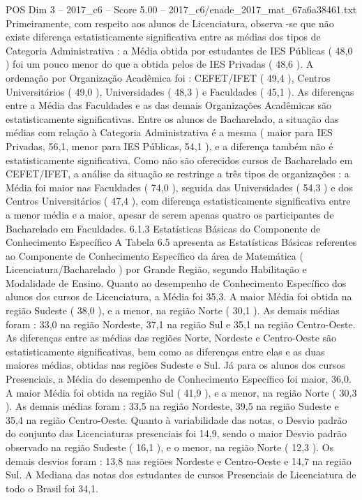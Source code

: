\begin{textsample}{POS Dim 3 – 2017\_c6 – Score 5.00 – 2017\_c6/enade\_2017\_mat\_67a6a38461.txt}
Primeiramente, com respeito aos alunos de Licenciatura, observa -se que não existe diferença estatisticamente significativa entre as médias dos tipos de Categoria Administrativa : a Média obtida por estudantes de IES Públicas ( 48,0 ) foi um pouco menor do que a obtida pelos de IES Privadas ( 48,6 ).
A ordenação por Organização Acadêmica foi : CEFET/IFET ( 49,4 ), Centros Universitários ( 49,0 ), Universidades ( 48,3 ) e Faculdades ( 45,1 ).
As diferenças entre a Média das Faculdades e as das demais Organizações Acadêmicas são estatisticamente significativas.
Entre os alunos de Bacharelado, a situação das médias com relação à Categoria Administrativa é a mesma ( maior para IES Privadas, 56,1, menor para IES Públicas, 54,1 ), e a diferença também não é estatisticamente significativa.
Como não são oferecidos cursos de Bacharelado em CEFET/IFET, a análise da situação se restringe a três tipos de organizações : a Média foi maior nas Faculdades ( 74,0 ), seguida das Universidades ( 54,3 ) e dos Centros Universitários ( 47,4 ), com diferença estatisticamente significativa entre a menor média e a maior, apesar de serem apenas quatro os participantes de Bacharelado em Faculdades. 6.1.3 Estatísticas Básicas do Componente de Conhecimento Específico A Tabela 6.5 apresenta as Estatísticas Básicas referentes ao Componente de Conhecimento Específico da área de Matemática ( Licenciatura/Bacharelado ) por Grande Região, segundo Habilitação e Modalidade de Ensino.
Quanto ao desempenho de Conhecimento Específico dos alunos dos cursos de Licenciatura, a Média foi 35,3.
A maior Média foi obtida na região Sudeste ( 38,0 ), e a menor, na região Norte ( 30,1 ).
As demais médias foram : 33,0 na região Nordeste, 37,1 na região Sul e 35,1 na região Centro-Oeste.
As diferenças entre as médias das regiões Norte, Nordeste e Centro-Oeste são estatisticamente significativas, bem como as diferenças entre elas e as duas maiores médias, obtidas nas regiões Sudeste e Sul.
Já para os alunos dos cursos Presenciais, a Média do desempenho de Conhecimento Específico foi maior, 36,0.
A maior Média foi obtida na região Sul ( 41,9 ), e a menor, na região Norte ( 30,3 ).
As demais médias foram : 33,5 na região Nordeste, 39,5 na região Sudeste e 35,4 na região Centro-Oeste.
Quanto à variabilidade das notas, o Desvio padrão do conjunto das Licenciaturas presenciais foi 14,9, sendo o maior Desvio padrão observado na região Sudeste ( 16,1 ), e o menor, na região Norte ( 12,3 ).
Os demais desvios foram : 13,8 nas regiões Nordeste e Centro-Oeste e 14,7 na região Sul.
A Mediana das notas dos estudantes de cursos Presenciais de Licenciatura de todo o Brasil foi 34,1.

\end{textsample}

